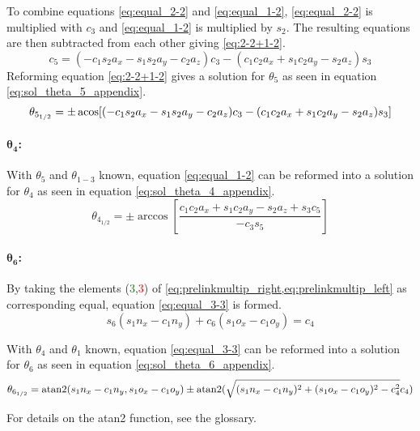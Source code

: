 To combine equations \ref{eq:equal_2-2} and \ref{eq:equal_1-2}, \ref{eq:equal_2-2} is multiplied with $c_3$ and  \ref{eq:equal_1-2} is multiplied by $ s_2$. The resulting equations are then subtracted from each other giving \ref{eq:2-2+1-2}.
\begin{equation}\label{eq:2-2+1-2}
c_5 = (-c_1 s_2 a_x - s_1 s_2 a_y -c_2 a_z) c_3 - (c_1 c_2 a_x +s_1 c_2 a_y - s_2 a_z) s_3
\end{equation}
Reforming equation \ref{eq:2-2+1-2} gives a solution for $\theta_5$ as seen in equation \ref{eq:sol_theta_5_appendix}.
\begin{equation}\label{eq:sol_theta_5_appendix}
\theta_{5_{1/2}} = \pm \operatorname{acos} [ ( -c_1 s_2 a_x - s_1 s_2 a_y - c_2 a_z) c_3 - (c_1 c_2 a_x + s_1 c_2 a_y - s_2 a_z) s_3]
\end{equation}

\paragraph{$\pmb{\theta_4}$:}

With $\theta_5$ and $\theta_{1-3}$ known, equation \ref{eq:equal_1-2} can be reformed into a solution for $\theta_4$ as seen in equation \ref{eq:sol_theta_4_appendix}.
\begin{equation}\label{eq:sol_theta_4_appendix}
\theta_{4_{1/2}} = \pm \arccos [ \frac{ c_1 c_2 a_x + s_1 c_2 a_y - s_2 a_z + s_3 c_5}{-c_3 s_5}]
\end{equation}

\paragraph{$\pmb{\theta_6}$:}
By taking the elements (\textcolor{green}{3},\textcolor{red}{3}) of \cref{eq:prelinkmultip_right,eq:prelinkmultip_left} as corresponding equal, equation \ref{eq:equal_3-3} is formed.
\begin{equation} \label{eq:equal_3-3}
s_6 (s_1 n_x - c_1 n_y) + c_6 (s_1 o_x - c_1 o_y ) = c_4
\end{equation}

With $\theta_4$ and $\theta_1$ known, equation \ref{eq:equal_3-3} can be reformed into a solution for $\theta_6$ as seen in equation \ref{eq:sol_theta_6_appendix}.
\begin{equation}\label{eq:sol_theta_6_appendix}
\theta_{6_{1/2}} = \operatorname{atan2}(s_1 n_x -c_1 n_y , s_1 o_x -c_1 o_y) \pm \operatorname{atan2}(\sqrt{(s_1 n_x - c_1 n_y)^2 + (s_1 o_x - c_1 o_y )^2 - c_4^2}  c_4)
\end{equation}
\medskip

For details on the \gls{atan2} function, see the glossary.
\medskip